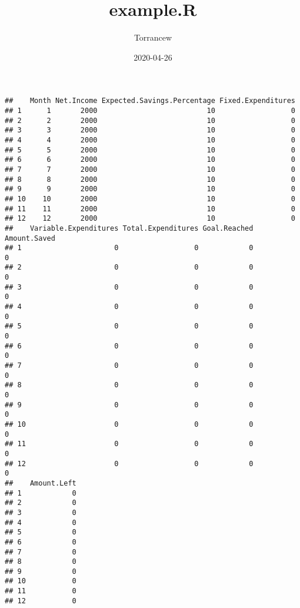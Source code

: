 \documentclass[
]{article}
\title{example.R}
\author{Torrancew}
\date{2020-04-26}
\newenvironment{Shaded}{\begin{snugshade}}{\end{snugshade}}
\newcommand{\CommentTok}[1]{\textcolor[rgb]{0.56,0.35,0.01}{\textit{#1}}}
\newcommand{\DecValTok}[1]{\textcolor[rgb]{0.00,0.00,0.81}{#1}}
\newcommand{\KeywordTok}[1]{\textcolor[rgb]{0.13,0.29,0.53}{\textbf{#1}}}
\newcommand{\NormalTok}[1]{#1}
\newcommand{\StringTok}[1]{\textcolor[rgb]{0.31,0.60,0.02}{#1}}
\begin{document}
\maketitle

\begin{Shaded}
\end{Shaded}

\begin{verbatim}
##    Month Net.Income Expected.Savings.Percentage Fixed.Expenditures
## 1      1       2000                          10                  0
## 2      2       2000                          10                  0
## 3      3       2000                          10                  0
## 4      4       2000                          10                  0
## 5      5       2000                          10                  0
## 6      6       2000                          10                  0
## 7      7       2000                          10                  0
## 8      8       2000                          10                  0
## 9      9       2000                          10                  0
## 10    10       2000                          10                  0
## 11    11       2000                          10                  0
## 12    12       2000                          10                  0
##    Variable.Expenditures Total.Expenditures Goal.Reached Amount.Saved
## 1                      0                  0            0            0
## 2                      0                  0            0            0
## 3                      0                  0            0            0
## 4                      0                  0            0            0
## 5                      0                  0            0            0
## 6                      0                  0            0            0
## 7                      0                  0            0            0
## 8                      0                  0            0            0
## 9                      0                  0            0            0
## 10                     0                  0            0            0
## 11                     0                  0            0            0
## 12                     0                  0            0            0
##    Amount.Left
## 1            0
## 2            0
## 3            0
## 4            0
## 5            0
## 6            0
## 7            0
## 8            0
## 9            0
## 10           0
## 11           0
## 12           0
\end{verbatim}
\end{document}
